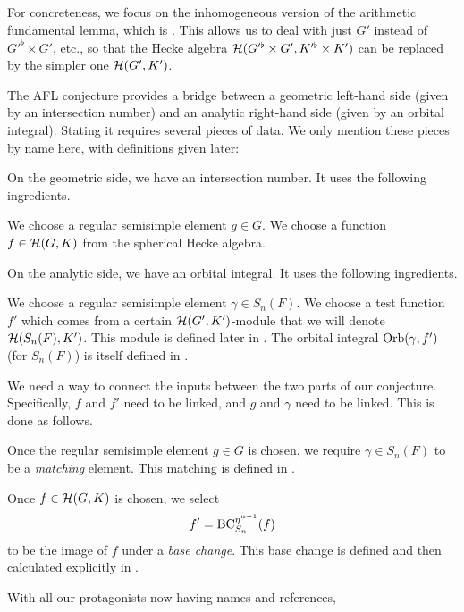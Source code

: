 For concreteness, we focus on the inhomogeneous version
of the arithmetic fundamental lemma, which is \cite[Conjecture 6.2.1]{ref:AFLspherical}.
This allows us to deal with just $G'$ instead of $G'^\flat \times G'$, etc.,
so that the Hecke algebra $\mathcal H(G'^\flat \times G', K'^\flat \times K')$
can be replaced by the simpler one $\mathcal H(G', K')$.

The AFL conjecture provides a bridge between a geometric left-hand side
(given by an intersection number)
and an analytic right-hand side (given by an orbital integral).
Stating it requires several pieces of data.
We only mention these pieces by name here, with definitions given later:
\begin{itemize}
  \ii On the geometric side, we have an intersection number.
  It uses the following ingredients.
  \begin{itemize}
    \ii We choose a regular semisimple element $g \in G$.
    \ii We choose a function $f \in \mathcal H(G, K)$ from the spherical Hecke algebra.
    \ii {}
  \end{itemize}

  \ii On the analytic side, we have an orbital integral.
  It uses the following ingredients.
  \begin{itemize}
    \ii We choose a regular semisimple element $\gamma \in S_n(F)$.
    \ii We choose a test function $f'$ which comes
    from a certain $\mathcal H(G',K')$-module that we will denote $\mathcal H(S_n(F), K')$.
    This module is defined later in .
    \ii The orbital integral $\operatorname{Orb}(\gamma, f')$
    (for $S_n(F)$) is itself defined in .
  \end{itemize}

  \ii We need a way to connect the inputs between the two parts of our conjecture.
  Specifically, $f$ and $f'$ need to be linked, and $g$ and $\gamma$ need to be linked.
  This is done as follows.
  \begin{itemize}
    \ii Once the regular semisimple element $g \in G$ is chosen,
    we require $\gamma \in S_n(F)$ to be a \emph{matching} element.
    This matching is defined in .

    \ii Once $f \in \mathcal H(G,K)$ is chosen, we select
    \[ f' = \operatorname{BC}_{S_n}^{\eta^{n-1}}(f) \]
    to be the image of $f$ under a \emph{base change}.
    This base change is defined and then calculated explicitly in .
  \end{itemize}
\end{itemize}
With all our protagonists now having names and references,
